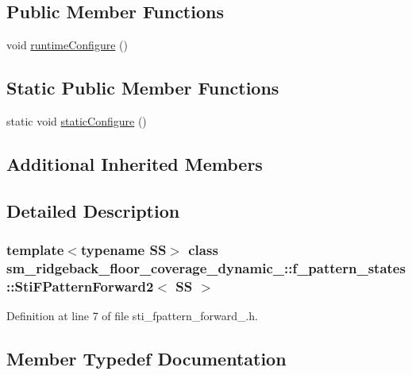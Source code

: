 \subsection*{Public Member Functions}
\begin{DoxyCompactItemize}
\item 
void \hyperlink{structsm__ridgeback__floor__coverage__dynamic__1_1_1f__pattern__states_1_1StiFPatternForward2_a1c0b901e6de910779d008f24e74f80dc}{runtime\+Configure} ()
\end{DoxyCompactItemize}
\subsection*{Static Public Member Functions}
\begin{DoxyCompactItemize}
\item 
static void \hyperlink{structsm__ridgeback__floor__coverage__dynamic__1_1_1f__pattern__states_1_1StiFPatternForward2_a177855fe54dc1c81d177ad0228a285dc}{static\+Configure} ()
\end{DoxyCompactItemize}
\subsection*{Additional Inherited Members}


\subsection{Detailed Description}
\subsubsection*{template$<$typename SS$>$\newline
class sm\+\_\+ridgeback\+\_\+floor\+\_\+coverage\+\_\+dynamic\+\_\+::f\+\_\+pattern\+\_\+states\+::\+Sti\+F\+Pattern\+Forward2$<$ S\+S $>$}



Definition at line 7 of file sti\+\_\+fpattern\+\_\+forward\+\_.\+h.



\subsection{Member Typedef Documentation}
\mbox{\label{structsm__ridgeback__floor__coverage__dynamic__1_1_1f__pattern__states_1_1StiFPatternForward2_ad691b196400a95f809744191e95d0486}} 
